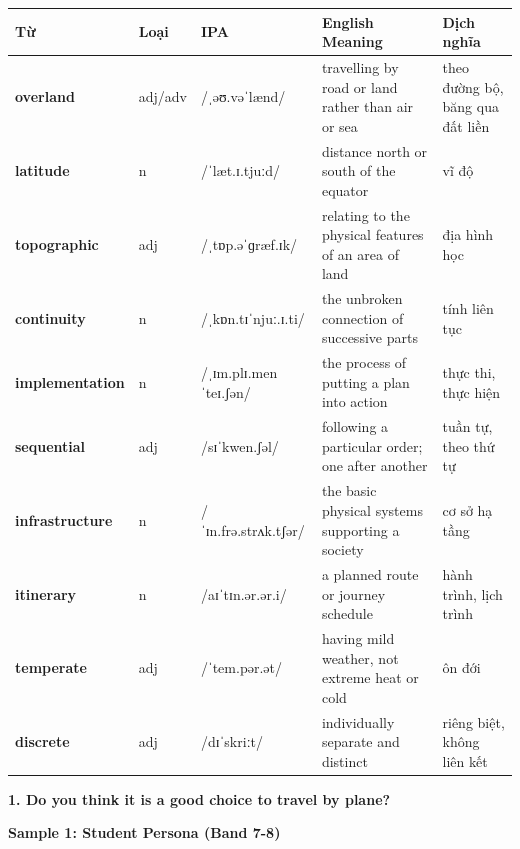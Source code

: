 \vspace{0.8em}
\begin{center}
\renewcommand{\arraystretch}{1.65}
\begin{tabularx}{\textwidth}{|V{0.22\textwidth}|C{0.07\textwidth}|I{0.20\textwidth}|Y|V{0.18\textwidth}|}
\hline
{}
\textbf{Từ} & \textbf{Loại} & \textbf{IPA} & \textbf{English Meaning} & \textbf{Dịch nghĩa} \\
\hline
\textbf{overland} & adj/adv & /ˌəʊ.vəˈlænd/ & travelling by road or land rather than air or sea & theo đường bộ, băng qua đất liền \\ \hline
\textbf{latitude} & n & /ˈlæt.ɪ.tjuːd/ & distance north or south of the equator & vĩ độ \\ \hline
\textbf{topographic} & adj & /ˌtɒp.əˈɡræf.ɪk/ & relating to the physical features of an area of land & địa hình học \\ \hline
\textbf{continuity} & n & /ˌkɒn.tɪˈnjuː.ɪ.ti/ & the unbroken connection of successive parts & tính liên tục \\ \hline
\textbf{implementation} & n & /ˌɪm.plɪ.menˈteɪ.ʃən/ & the process of putting a plan into action & thực thi, thực hiện \\ \hline
\textbf{sequential} & adj & /sɪˈkwen.ʃəl/ & following a particular order; one after another & tuần tự, theo thứ tự \\ \hline
\textbf{infrastructure} & n & /ˈɪn.frə.strʌk.tʃər/ & the basic physical systems supporting a society & cơ sở hạ tầng \\ \hline
\textbf{itinerary} & n & /aɪˈtɪn.ər.ər.i/ & a planned route or journey schedule & hành trình, lịch trình \\ \hline
\textbf{temperate} & adj & /ˈtem.pər.ət/ & having mild weather, not extreme heat or cold & ôn đới \\ \hline
\textbf{discrete} & adj & /dɪˈskriːt/ & individually separate and distinct & riêng biệt, không liên kết \\ \hline
\end{tabularx}
\end{center}

\partthreeheader

\begin{ieltsquestion}
\textbf{1. Do you think it is a good choice to travel by plane?}
\end{ieltsquestion}
\textbf{Sample 1: Student Persona (Band 7-8)}

